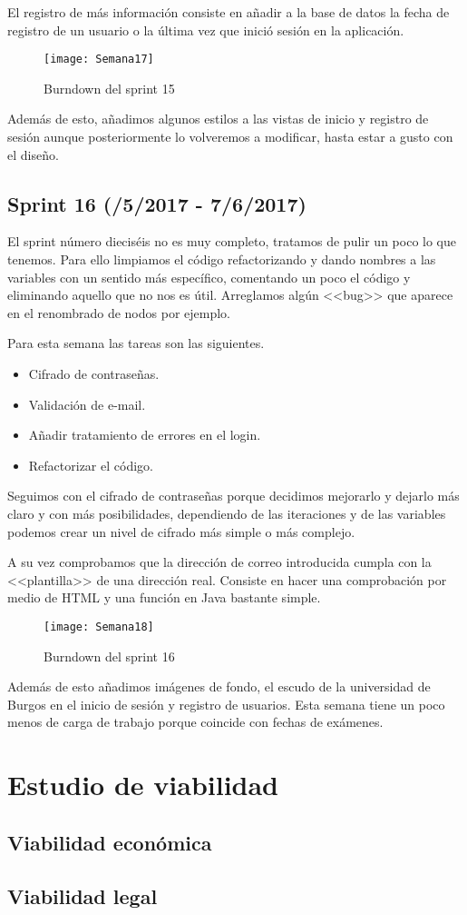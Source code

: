 El registro de más información consiste en añadir a la base de datos la fecha de registro de un usuario o la última vez que inició sesión en la aplicación.

\begin{figure}[h]
\centering
\texttt{[image: Semana17]}
\caption{Burndown del sprint 15}
\label{fig:A.2.6}
\end{figure}

Además de esto, añadimos algunos estilos a las vistas de inicio y registro de sesión aunque posteriormente lo volveremos a modificar, hasta estar a gusto con el diseño.

\subsection{Sprint 16 (/5/2017 - 7/6/2017)}

El sprint número dieciséis no es muy completo, tratamos de pulir un poco lo que tenemos. Para ello limpiamos el código refactorizando y dando nombres a las variables con un sentido más específico, comentando un poco el código y eliminando aquello que no nos es útil. Arreglamos algún <<bug>> que aparece en el renombrado de nodos por ejemplo.


Para esta semana las tareas son las siguientes.
\begin{itemize}
\item Cifrado de contraseñas.
\item Validación de e-mail.
\item Añadir tratamiento de errores en el login.
\item Refactorizar el código.
\end{itemize}

Seguimos con el cifrado de contraseñas porque decidimos mejorarlo y dejarlo más claro y con más posibilidades, dependiendo de las iteraciones y de las variables podemos crear un nivel de cifrado más simple o más complejo. 

A su vez comprobamos que la dirección de correo introducida cumpla con la <<plantilla>> de una dirección real. Consiste en hacer una comprobación por medio de HTML y una función en Java bastante simple.

\begin{figure}[h]
\centering
\texttt{[image: Semana18]}
\caption{Burndown del sprint 16}
\label{fig:A.2.6}
\end{figure}

Además de esto añadimos imágenes de fondo, el escudo de la universidad de Burgos en el inicio de sesión y registro de usuarios. Esta semana tiene un poco menos de carga de trabajo porque coincide con fechas de exámenes.


\section{Estudio de viabilidad}

\subsection{Viabilidad económica}

\subsection{Viabilidad legal}


